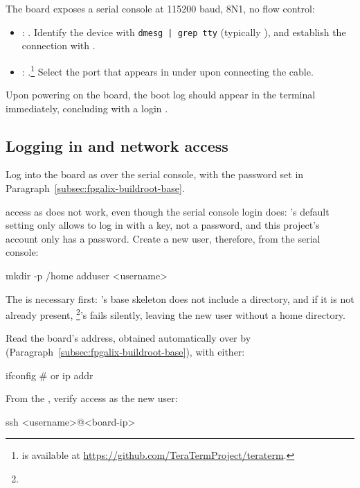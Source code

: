 The board exposes a serial console at 115200 baud, 8N1, no flow control:

\begin{itemize}
    \item {}: . Identify the device with \lstinline[style=githubcppinline]!dmesg | grep tty! (typically ), and establish the connection with .
    \item {}: .\footnote{ is available at \url{https://github.com/TeraTermProject/teraterm}.} Select the  port that appears in  under  upon connecting the cable.
\end{itemize}

Upon powering on the board, the boot log should appear in the terminal immediately, concluding with a login .

\subsection{Logging in and network access}
\label{subsec:fpgalix-login-network}

Log into the board as  over the serial console, with the password set in Paragraph~\ref{subsec:fpgalix-buildroot-base}.

 access as  does not work, even though the serial console login does: 's default  setting only allows  to log in with a key, not a password, and this project's  account only has a password. Create a new user, therefore, from the serial console:

\begin{shellcodeboard}
mkdir -p /home
adduser <username>
\end{shellcodeboard}

The  is necessary first: 's base skeleton does not include a  directory, and if it is not already present, \footnote{}'s  fails silently, leaving the new user without a home directory.

Read the board's  address, obtained automatically over  by  (Paragraph~\ref{subsec:fpgalix-buildroot-base}), with either:

\begin{shellcodeboard}
ifconfig
# or
ip addr
\end{shellcodeboard}

From the , verify  access as the new user:

\begin{shellcodehost}
ssh <username>@<board-ip>
\end{shellcodehost}

